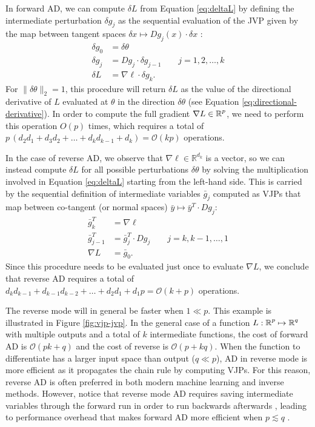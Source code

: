 In forward AD, we can compute $\delta L$ from Equation \eqref{eq:deltaL} by defining the intermediate perturbation $\delta g_j$ as the sequential evaluation of the JVP given by the map between tangent spaces ${\delta x \mapsto Dg_j (x) \cdot \delta x}$ \cite{Griewank:2008kh}:
\begin{align}
    \delta g_0 &= \delta \theta \\
    \delta g_j &= D g_j \cdot \delta g_{j-1} \qquad j = 1, 2, \ldots, k \\
    \delta L &= \nabla \ell \cdot \delta g_{k}.
\end{align}
For $\| \delta \theta \|_2 = 1$, this procedure will return $\delta L$ as the value of the directional derivative of $L$ evaluated at $\theta$ in the direction $\delta \theta$ (see Equation \eqref{eq:directional-derivative}). 
In order to compute the full gradient $\nabla L \in \operatorname{\mathbb{R}}^p$, we need to perform this operation $O(p)$ times, which requires a total of $p \, (d_2 d_1 + d_3 d_2 + \ldots + d_k d_{k-1} + d_k )= \mathcal O (kp)$ operations.

In the case of reverse AD, we observe that $\nabla \ell \in \mathbb R^{d_k}$ is a vector, so we can instead compute $\delta L$ for all possible perturbations $\delta \theta$ by solving the multiplication involved in Equation \eqref{eq:deltaL} starting from the left-hand side. 
This is carried by the sequential definition of intermediate variables $\bar g_j$ computed as VJPs that map between co-tangent (or normal spaces) $\bar y \mapsto \bar y^T \cdot Dg_j$:
\begin{align}
    \bar g_{k}^T &= \nabla \ell \\
    \bar g_{j-1}^T &= \bar g_{j}^T \cdot Dg_j \qquad j = k, k-1, \ldots, 1 \\
    \nabla L &= \bar g_0.
\end{align}
Since this procedure needs to be evaluated just once to evaluate $\nabla L$, we conclude that reverse AD requires a total of $ d_k d_{k-1} + d_{k-1} d_{k-2} + \ldots + d_2 d_1 + d_1 p = \mathcal O (k+p)$ operations. 

The reverse mode will in general be faster when $1 \ll p$. 
This example is illustrated in Figure \ref{fig:vjp-jvp}. 
In the general case of a function $L : \operatorname{\mathbb{R}}^p \mapsto \operatorname{\mathbb{R}}^q$ with multiple outputs and a total of $k$ intermediate functions, the cost of forward AD is $\mathcal O (pk + q)$ and the cost of reverse is $\mathcal O (p + kq)$.
When the function to differentiate has a larger input space than output ($q \ll p$), AD in reverse mode is more efficient as it propagates the chain rule by computing VJPs.
For this reason, reverse AD is often preferred in both modern machine learning and inverse methods.
However, notice that reverse mode AD requires saving intermediate variables through the forward run in order to run backwards afterwards \cite{Bennett_1973}, leading to performance overhead that makes forward AD more efficient when $p \lesssim q$ \cite{Griewank_1989, Margossian.2019, Baydin_Pearlmutter_Radul_Siskind_2015}. 

